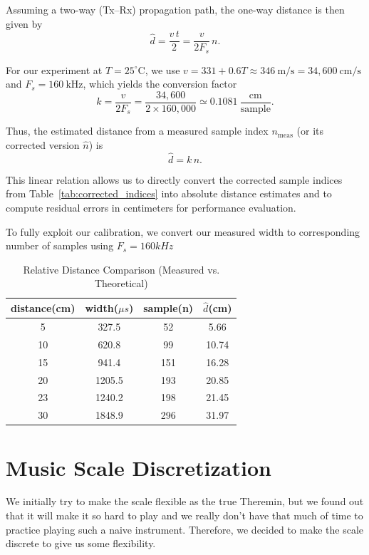 \documentclass[12pt]{article}
\begin{document}
Assuming a two-way (Tx–Rx) propagation path, the one-way distance is then given by
\[
\hat{d} = \frac{v \, t}{2} = \frac{v}{2 F_s}\, n.
\]

For our experiment at $T = 25^\circ\mathrm{C}$, we use
$v = 331 + 0.6T \approx 346\ \mathrm{m/s} = 34{,}600\ \mathrm{cm/s}$ and
$F_s = 160\ \mathrm{kHz}$, which yields the conversion factor
\[
k = \frac{v}{2F_s}
= \frac{34{,}600}{2 \times 160{,}000}
\simeq 0.1081\ \frac{\mathrm{cm}}{\mathrm{sample}}.
\]

Thus, the estimated distance from a measured sample index $n_{\mathrm{meas}}$ (or its corrected version $\hat{n}$) is
\[
\hat{d} = k \, n.
\]

This linear relation allows us to directly convert the corrected sample indices from
Table~\ref{tab:corrected_indices} into absolute distance estimates and to compute residual
errors in centimeters for performance evaluation.


To fully exploit our calibration, we convert our measured width to corresponding number of samples using $F_s = 160kHz$
\begin{table}[h!]
\centering
\caption{Relative Distance Comparison (Measured vs. Theoretical)}
\begin{tabular}{|c|c|c|c|}
\hline
distance(cm) & width($\mu s$) & sample(n) & $\hat{d}$(cm)\\
\hline
5   & 327.5 &  52& 5.66\\
10  & 620.8 &  99&10.74\\
15  & 941.4 & 151&16.28\\
20  & 1205.5& 193&20.85\\
23  & 1240.2& 198&21.45\\
30  & 1848.9& 296&31.97\\
\hline
\end{tabular}
\end{table}

\section{Music Scale Discretization}

We initially try to make the scale flexible as the true Theremin, but we found out that it will make it 
so hard to play and we really don't have that much of time to practice playing such a naive instrument. 
Therefore, we decided to make the scale discrete to give us some flexibility.
\end{document}
